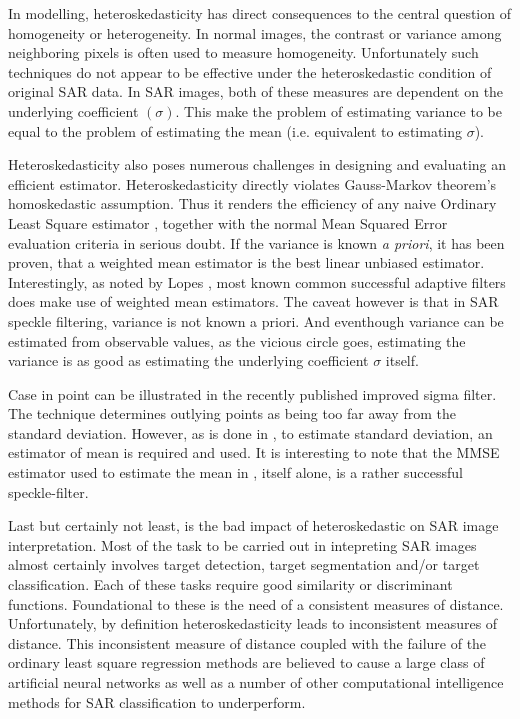 \documentclass[journal]{IEEEtran}
\begin{document}
In modelling, heteroskedasticity has direct consequences to the central question of homogeneity or heterogeneity. 
In normal images, the contrast or variance among neighboring pixels is often used to measure homogeneity. 
Unfortunately such techniques do not appear to be effective under the heteroskedastic condition of original SAR data. 
In SAR images, both of these measures are dependent on the underlying coefficient $(\sigma)$. 
This make the problem of estimating variance to be equal to the problem of estimating the mean (i.e. equivalent to estimating $\sigma$).

Heteroskedasticity also poses numerous challenges in designing and evaluating an efficient estimator. 
Heteroskedasticity directly violates Gauss-Markov theorem's homoskedastic assumption. 
Thus it renders the efficiency of any naive Ordinary Least Square estimator \cite{Furno_1991_JStatCompSimul}, together with the normal Mean Squared Error evaluation criteria in serious doubt. 
If the variance is known \textit{a priori}, it has been proven, that a weighted mean estimator is the best linear unbiased estimator. 
Interestingly, as noted by Lopes \cite{Lopes_TGRS_1990}, most known common successful adaptive filters \cite{Lee_PAMI_1980} \cite{Kuan_1985_PAMI} \cite{Frost_PAMI_1982} does make use of weighted mean estimators. 
The caveat however is that in SAR speckle filtering, variance is not known a priori. 
And eventhough variance can be estimated from observable values, as the vicious circle goes, estimating the variance is as good as estimating the underlying coefficient $\sigma$ itself.

Case in point can be illustrated in the recently published improved sigma filter\cite{Lee_TGRS_2009}. 
The technique determines outlying points as being too far away from the standard deviation. 
However, as is done in \cite{Lee_TGRS_2009}, to estimate standard deviation, an estimator of mean is required and used. 
It is interesting to note that the MMSE estimator used to estimate the mean in \cite{Lee_TGRS_2009}, itself alone, is a rather successful speckle-filter\cite{Lee_PAMI_1980}.

Last but certainly not least, is the bad impact of heteroskedastic on SAR image interpretation. 
Most of the task to be carried out in intepreting SAR images almost certainly involves target detection, target segmentation and/or target classification. 
Each of these tasks require good similarity or discriminant functions. 
Foundational to these is the need of a consistent measures of distance. 
Unfortunately, by definition heteroskedasticity leads to inconsistent measures of distance. 
This inconsistent measure of distance coupled with the failure of the ordinary least square regression methods are
 believed to cause a large class of artificial neural networks as well as a number of other computational intelligence methods for SAR classification to underperform.
\end{document}
